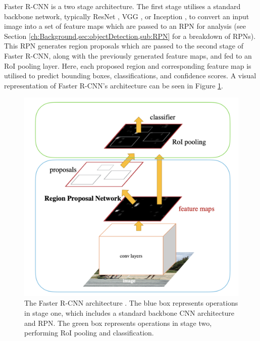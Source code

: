 Faster R-CNN is a two stage architecture. The first stage utilises a standard backbone network, typically ResNet \cite{he_deep_2015}, VGG \cite{simonyan_very_2015}, or Inception \cite{szegedy_going_2015}, to convert an input image into a set of feature maps which are passed to an RPN for analysis (see Section \ref{ch:Background,sec:objectDetection,sub:RPN} for a breakdown of RPNs). This RPN generates region proposals which are passed to the second stage of Faster R-CNN, along with the previously generated feature maps, and fed to an RoI pooling layer.  Here, each proposed region and corresponding feature map is utilised to predict bounding boxes, classifications, and confidence scores. A visual representation of Faster R-CNN's architecture can be seen in Figure \ref{fig:faster-r-cnn-architecture}.


\begin{figure}
	\begin{center}
		\includegraphics[scale=0.3]{Chapter2/figs/faster-r-cnn-architecture.png}
	\end{center}
	\caption[The Faster R-CNN architecture \cite{ren_faster_2015}.]{The Faster R-CNN architecture \cite{ren_faster_2015}. The blue box represents operations in stage one, which includes a standard backbone CNN architecture and RPN. The green box represents operations in stage two, performing RoI pooling and classification.}
	\label{fig:faster-r-cnn-architecture}
\end{figure}

